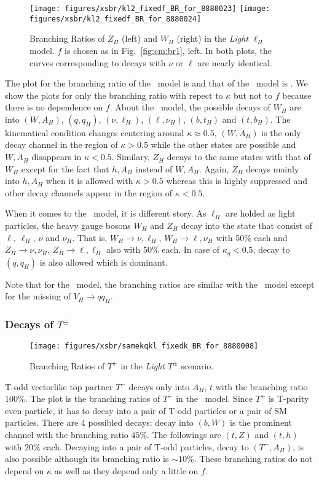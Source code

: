 \begin{figure*}
\centering
\texttt{[image: figures/xsbr/kl2\_fixedf\_BR\_for\_8880023]} \quad
\texttt{[image: figures/xsbr/kl2\_fixedf\_BR\_for\_8880024]}
\caption{Branching Ratios of $Z_H$ (left) and $W_H$ (right)  in the \emph{Light $\ell_H$} model. $f$ is chosen as in Fig.~\ref{fig:cm:br1}, left.
In both plots, the curves corresponding to decays with $\nu$ or $\ell$ are nearly identical.}
\label{fig:cm:br2324kl}
\end{figure*}
The plot for the branching ratio of the \fu~model is  and that of the \lil~model is . 
We show the plots for only the branching ratio with repect to $\kappa$ but not to $f$ because there is no dependence on $f$.  
About the \fu~model, the possible decays of $W_H$ are into $(W, A_H)$, $(q, q_H)$, $(\nu, \ell_H)$, $(\ell, \nu_H)$, $(b, t_H)$ and $(t, b_H)$.
The kinematical condition changes centering around $\kappa \approx 0.5$,
$(W, A_H)$ is the only decay channel in the region of $\kappa > 0.5$ 
while the other states are possible and $W, A_H$ disappears in $\kappa < 0.5$.
Similary, $Z_H$ decays to the same states with that of $W_H$ except for the fact that $h, A_H$ instead of $W, A_H$. 
Again, $Z_H$ decays mainly into $h, A_H$ when it is allowed with $\kappa > 0.5$
whereas this is highly suppressed and other decay channels appear in the region of $\kappa < 0.5 $.

When it comes to the \lil~model, it is different story. 
As $\ell_H$ are holded as light particles, the heavy gauge bosons $W_H$ and $Z_H$ decay into the state 
that consist of $\ell,~\ell_H,~\nu$ and $\nu_H$. 
That is, $W_H \to \nu, \ell_H$, $W_H\to \ell, \nu_H$ with 50\% each 
and $Z_H \to \nu, \nu_H$, $Z_H \to \ell, \ell_H$ also with 50\% each. 
In case of $\kappa_q < 0.5$, decay to $(q, q_H)$ is also allowed which is dominant. 

Note that for the \hq~model, the branching ratios are similar with the \fu~model 
except for the missing of $V_H \to q q_H$. 



\subsubsection*{Decays of $T^\pm$}
\begin{figure}
\centering
\texttt{[image: figures/xsbr/samekqkl\_fixedk\_BR\_for\_8880008]} 
\caption{Branching Ratios of $T^+$ in the \emph{Light $T^\pm$} scenario.}
\label{fig:cm:br7}
\end{figure}
T-odd vectorlike top partner $T^-$ decays only into $A_H$, $t$ with the branching ratio $100\%$. 
The plot  is the branching ratios of $T^+$ in the \lil~model. 
Since $T^+$ is T-parity even particle, it has to decay into a pair of T-odd particles or a pair of SM particles.
There are 4 possibled decays: decay into $(b,W)$ is the prominent channel with the branching ratio $45\%$.
The followings are $(t,Z)$ and $(t,h)$ with $20\%$ each. 
Decaying into a pair of T-odd particles, decay to $(T^-,A_H)$, is also possible although its branching ratio is $\sim 10\%$.
These branching ratios do not depend on $\kappa$ as well as they depend only a little on $f$. 


